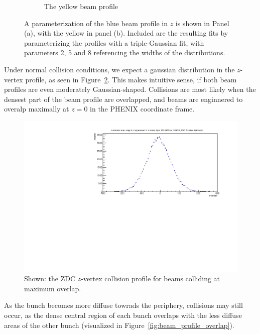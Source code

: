\begin{figure}
\begin{subfigure}[b]{0.8\textwidth}
    \caption{The yellow beam profile}
  \end{subfigure}
  \caption{
    A parameterization of the blue beam profile in $z$ is shown in Panel (a),
    with the yellow in panel (b). Included are the resulting fits by
    parameterizing the profiles with a triple-Gaussian fit, with parameters 2, 5
    and 8 referencing the widths of the distributions.
  }
  \label{fig:z_profile}
\end{figure}

Under normal collision conditions, we expect a gaussian distribution in the
$z$-vertex profile, as seen in Figure~\ref{fig:zdc_zprofile_max_overlap}. This
makes intuitive sense, if both beam profiles are even moderately
Gaussian-shaped. Collisions are most likely when the densest part of the beam
profile are overlapped, and beams are enginnered to overalp maximally at $z=0$
in the PHENIX coordinate frame.

\begin{figure}[ht]
  \centering
  \includegraphics[width=0.8\linewidth]{./figures/zdc_zvtx_max_overlap_359711.pdf}
  \caption{
    Shown: the ZDC $z$-vertex collision profile for beams colliding at maximum
    overlap. 
  }
  \label{fig:zdc_zprofile_max_overlap}
\end{figure}

As the bunch becomes more diffuse towrads the periphery, collisions may still
occur, as the dense central region of each bunch overlaps with the less diffuse
areas of the other bunch (visualized in Figure~\ref{fig:beam_profile_overlap}).


